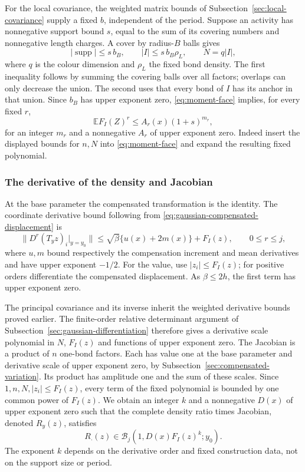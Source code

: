 For the local covariance, the weighted matrix bounds of
Subsection~\ref{sec:local-covariance} supply a fixed $b$, independent
of the period. Suppose an activity has nonnegative support bound
$s$, equal to the sum of its covering numbers and nonnegative
length charges. A cover by radius-$B$ balls gives
\[
 |\operatorname{supp}|\le s\,b_B,\qquad
 |I|\le s\,b_B\rho_L,\qquad N=q|I|,
\]
where $q$ is the colour dimension and $\rho_L$ the fixed bond
density. The first inequality follows by summing the covering
balls over all factors; overlaps can only decrease the union.
The second uses that every bond of $I$ has its anchor in that union.
Since $b_B$ has upper exponent zero, \eqref{eq:moment-face} implies,
for every fixed $r$,
\begin{equation}\label{eq:moment-support}
 \mathbb E F_I(Z)^r\le A_r(x)(1+s)^{m_r},
\end{equation}
for an integer $m_r$ and a nonnegative $A_r$ of upper exponent
zero. Indeed insert the displayed bounds for $n,N$ into
\eqref{eq:moment-face} and expand the resulting fixed polynomial.

\subsubsection{The derivative of the density and Jacobian}
At the base parameter the compensated transformation is the identity.
The coordinate derivative bound following from
\eqref{eq:gaussian-compensated-displacement} is
\[
 \|D^r(T_yz)_i|_{y=y_0}\|
 \le\sqrt\beta\{u(x)+2m(x)\}+F_I(z),\qquad0\le r\le j,
\]
where $u,m$ bound respectively the compensation increment and mean
derivatives and have upper exponent $-1/2$. For the value, use
$|z_i|\le F_I(z)$; for positive orders differentiate the
compensated displacement. As $\beta\le2h$, the first term has
upper exponent zero.

The principal covariance and its inverse inherit the weighted
derivative bounds proved earlier. The finite-order relative
determinant argument of Subsection~\ref{sec:gaussian-differentiation}
therefore gives a derivative scale polynomial in $N$,
$F_I(z)$ and functions of upper exponent zero. The Jacobian is
a product of $n$ one-bond factors. Each has value one at the base
parameter and derivative scale of upper exponent zero, by
Subsection~\ref{sec:compensated-variation}. Its product has amplitude
one and the sum of these scales. Since $1,n,N,|z_i|\le F_I(z)$,
every term of the fixed polynomial is bounded by one common
power of $F_I(z)$. We obtain an integer $k$ and a nonnegative
$D(x)$ of upper exponent zero such that the complete density
ratio times Jacobian, denoted $R_y(z)$, satisfies
\begin{equation}\label{eq:moment-ratio-jets}
 R_{\cdot}(z)\in\mathcal B_j(1,D(x)F_I(z)^k;y_0).
\end{equation}
The exponent $k$ depends on the derivative order and fixed
construction data, not on the support size or period.

